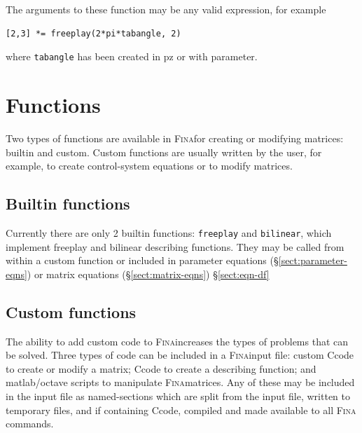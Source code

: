 \documentclass[10pt,openany,twoside]{book}
\numberwithin{equation}{section}   %
\def\Cpp{{C\nolinebreak[4]\hspace{-.05em}\raisebox{.4ex}{\tiny\bf ++}}\:}
\newcommand{\Cmd}[1]{{\sf #1}}
\newcommand{\Code}[1]{{\small\tt #1}}
\newcommand{\Fina}{{\normalfont\scshape Fina\:}}
\newcommand{\Octlab}{\Cmd{matlab}/\Cmd{octave}\:}
\newcommand{\Sectref}[1]{\S\ref{#1}}
\begin{document}
The arguments to these function may be any valid expression, for example
\begin{lstlisting}
[2,3] *= freeplay(2*pi*tabangle, 2)
\end{lstlisting}
where \Code{tabangle} has been created in \Cmd{pz} or with \Cmd{parameter}.

\newpage
\section{Functions}\label{sect:functions}
Two types of functions are available in \Fina for creating or modifying
matrices: builtin and custom. Custom functions are usually written by the
user, for example, to create control-system equations or to modify matrices.

\subsection{Builtin functions} 
Currently there are only 2 builtin functions: \Code{freeplay} and \Code{bilinear},
which implement freeplay and bilinear describing functions. They may be called
from within a custom function or included in parameter equations
(\Sectref{sect:parameter-eqns}) or matrix equations (\Sectref{sect:matrix-eqns})
\Sectref{sect:eqn-df}

\subsection{Custom functions}\label{sect:custom-functions}
The ability to add custom code to \Fina increases the types
of problems that can be solved. Three types of code can be included
in a \Fina input file: custom \Cpp code to create or modify a matrix;
\Cpp code to create a describing function; and \Octlab
scripts to manipulate \Fina matrices.
Any of these may be included in the input file as named-sections
which are split from the input file, written to temporary files, and
if containing \Cpp code, compiled and made available to all \Fina
commands.
\end{document}
